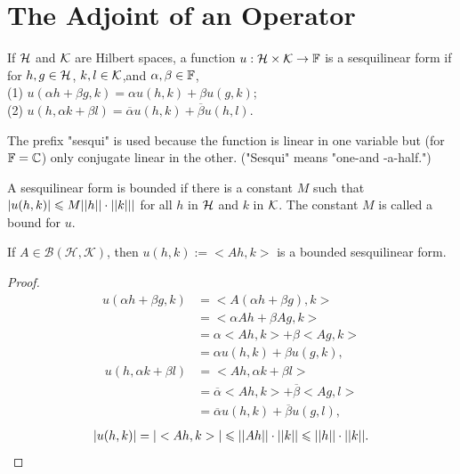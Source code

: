 \chapter{The Adjoint of an Operator}\label{chp:2_2}

\begin{definition}{}{}
    If $\mathcal{H}$ and $\mathcal{K}$ are Hilbert spaces, a function $u:\mathcal{H}\times\mathcal{K}\rightarrow \mathbb{F}$ is a sesquilinear form if for 
    $h,g\in\mathcal{H}$, $k,l\in \mathcal{K}$,and $\alpha,\beta\in\mathbb{F}$,\\
    (1) $u(\alpha h+\beta g,k)=\alpha u(h,k)+\beta u(g,k)$;\\
    (2) $u(h,\alpha k+\beta l)=\overline{\alpha}u(h,k)+\overline{\beta}u(h,l)$.\\
\end{definition}

The prefix "sesqui" is used because the function is linear in one variable 
but (for $\mathbb{F} = \mathbb{C}$) only conjugate linear in the other. ("Sesqui" means 
"one-and -a-half.")

A sesquilinear form is bounded if there is a constant $M$ such that 
$|u(h,k)|\leqslant M||h||\cdot ||k|||$ for all $h$ in $\mathcal{H}$ and $k$ in $\mathcal{K}$. 
The constant $M$ is called a bound for $u$.


\begin{proposition}
    If $A \in \mathcal{B}(\mathcal{H},\mathcal{K})$, 
then $u(h, k):=  <Ah, k>$ is a bounded sesquilinear form.
\end{proposition}

\begin{proof}{}{}
    \begin{align*}
        u(\alpha h+\beta g,k) &=  <A(\alpha h+\beta g),k>\\
                            &= <\alpha Ah+\beta Ag,k>\\
                            &= \alpha <Ah,k> + \beta<Ag,k>\\
                            &= \alpha u(h,k) + \beta u(g,k),
    \end{align*}
    \begin{align*}
        u(h,\alpha k+\beta l) &=  <Ah,\alpha k+\beta l>\\
                            &= \overline{\alpha} <Ah,k> + \overline{\beta}<Ag,l>\\
                            &= \overline{\alpha} u(h,k) + \overline{\beta} u(g,l),
    \end{align*}
    \begin{align*}
        |u(h,k)| = |<Ah,k>|\leqslant ||Ah||\cdot ||k||\leqslant ||h||\cdot||k||.
    \end{align*}
\end{proof}


